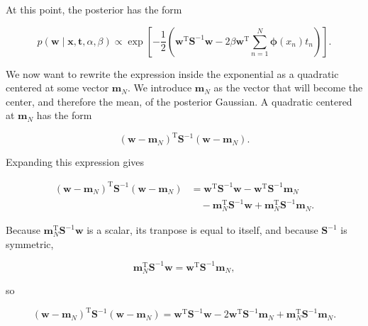 \documentclass[10pt,twocolumn]{memoir}
\begin{document}
At this point, the posterior has the form

\begin{equation}
    p(\mathbf{w}\mid\mathbf{x},\mathbf{t},\alpha,\beta)\propto\exp
    \left[-\frac{1}{2}
    \left(\mathbf{w}^{\mathrm{T}}\mathbf{S}^{-1}\mathbf{w} - 2\beta\mathbf{w}^{\mathrm{T}}\sum_{n=1}^{N}\boldsymbol{\phi}(x_n)t_n\right)
    \right].
\end{equation}

We now want to rewrite the expression inside the exponential as a quadratic centered at some vector $\mathbf{m}_N$. We introduce $\mathbf{m}_N$ as the vector that will become the center, and therefore the mean, of the posterior Gaussian. A quadratic centered at $\mathbf{m}_N$ has the form

\begin{equation}
    (\mathbf{w}-\mathbf{m}_N)^{\mathrm{T}}\mathbf{S}^{-1}(\mathbf{w}-\mathbf{m}_N).
\end{equation}

Expanding this expression gives

\begin{equation}
\begin{aligned}
    (\mathbf{w}-\mathbf{m}_N)^{\mathrm{T}}\mathbf{S}^{-1}(\mathbf{w}-\mathbf{m}_N)
    &=
    \mathbf{w}^{\mathrm{T}}\mathbf{S}^{-1}\mathbf{w} - \mathbf{w}^{\mathrm{T}}\mathbf{S}^{-1}\mathbf{m}_N \\
    &\quad
    - \mathbf{m}_N^{\mathrm{T}}\mathbf{S}^{-1}\mathbf{w} + \mathbf{m}_N^{\mathrm{T}}\mathbf{S}^{-1}\mathbf{m}_N.
\end{aligned}
\end{equation}

Because $\mathbf{m}_N^{\mathrm{T}}\mathbf{S}^{-1}\mathbf{w}$ is a scalar, its tranpose is equal to itself, and because $\mathbf{S}^{-1}$ is symmetric,

\begin{equation}
    \mathbf{m}_N^{\mathrm{T}}\mathbf{S}^{-1}\mathbf{w} = \mathbf{w}^{\mathrm{T}}\mathbf{S}^{-1}\mathbf{m}_N,
\end{equation}

so

\begin{equation}
    (\mathbf{w}-\mathbf{m}_N)^{\mathrm{T}}\mathbf{S}^{-1}(\mathbf{w}-\mathbf{m}_N) = \mathbf{w}^{\mathrm{T}}\mathbf{S}^{-1}\mathbf{w} - 2\mathbf{w}^{\mathrm{T}}\mathbf{S}^{-1}\mathbf{m}_N + \mathbf{m}_N^{\mathrm{T}}\mathbf{S}^{-1}\mathbf{m}_N.
\end{equation}
\end{document}
